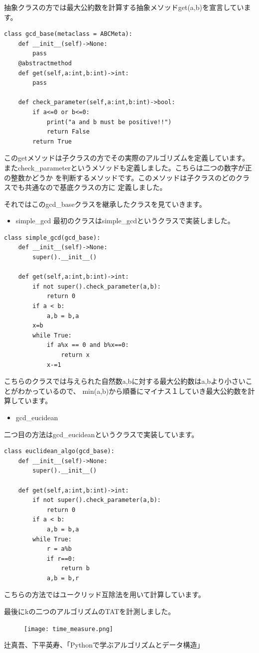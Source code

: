 \documentclass[dvipdfmx]{jarticle}
\begin{document}
抽象クラスの方では最大公約数を計算する抽象メソッドget(a,b)を宣言しています。
\begin{lstlisting}[caption=gcd\_base,label=base]
class gcd_base(metaclass = ABCMeta):
    def __init__(self)->None:
        pass
    @abstractmethod
    def get(self,a:int,b:int)->int:
        pass

    def check_parameter(self,a:int,b:int)->bool:
        if a<=0 or b<=0:
            print("a and b must be positive!!")
            return False
        return True
 \end{lstlisting}
このgetメソッドは子クラスの方でその実際のアルゴリズムを定義しています。
またcheck\_parameterというメソッドも定義しました。こちらは二つの数字が正の整数かどうか
を判断するメソッドです。このメソッドは子クラスのどのクラスでも共通なので基底クラスの方に
定義しました。

それではこのgcd\_baseクラスを継承したクラスを見ていきます。
\begin{itemize}
\item simple\_gcd
最初のクラスはsimple\_gcdというクラスで実装しました。
\end{itemize}
\begin{lstlisting}[caption=gcd\_simple,label=simple]
class simple_gcd(gcd_base):
    def __init__(self)->None:
        super().__init__()

    def get(self,a:int,b:int)->int:
        if not super().check_parameter(a,b):
            return 0
        if a < b:
            a,b = b,a
        x=b
        while True:
            if a%x == 0 and b%x==0:
                return x
            x-=1
 \end{lstlisting}
 こちらのクラスでは与えられた自然数a,bに対する最大公約数はa,bより小さいことがわかっているので、
 min(a,b)から順番にマイナス１していき最大公約数を計算しています。
 \begin{itemize}
\item gcd\_eucidean
\end{itemize}
二つ目の方法はgcd\_eucideanというクラスで実装しています。
\begin{lstlisting}[caption=gcd\_eucidean,label=euclidean]
 class euclidean_algo(gcd_base):
    def __init__(self)->None:
        super().__init__()

    def get(self,a:int,b:int)->int:
        if not super().check_parameter(a,b):
            return 0
        if a < b:
            a,b = b,a
        while True:
            r = a%b
            if r==0:
                return b
            a,b = b,r
 \end{lstlisting} 
 こちらの方法ではユークリッド互除法を用いて計算しています。
 
 最後にkの二つのアルゴリズムのTATを計測しました。
 \begin{figure}[h]
 \begin{center}
\texttt{[image: time\_measure.png]}
\end{center}
\end{figure}

\begin{thebibliography}{9}
\item 辻真吾、下平英寿、「Pythonで学ぶアルゴリズムとデータ構造」
\end{thebibliography}
\end{document}
